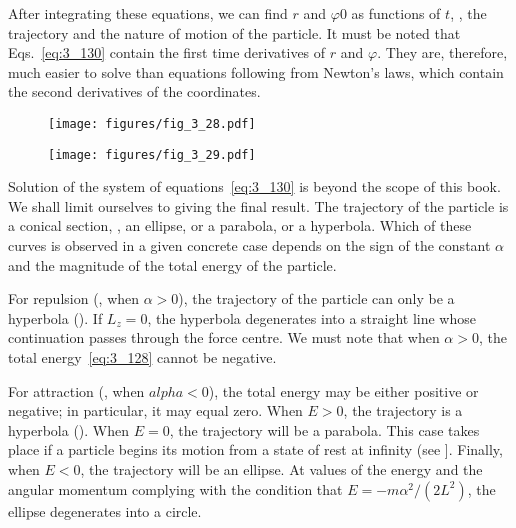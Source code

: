 \noindent
After integrating these equations, we can find $r$ and $\varphi0$ as functions of $t$, \ie, the trajectory and the nature of motion of the particle. It must be noted that Eqs.~\eqref{eq:3_130} contain the first time derivatives of $r$ and $\varphi$. They are, therefore, much easier to solve than equations following from Newton's laws, which contain the second derivatives of the coordinates.

\begin{figure}[t]
	\begin{minipage}[t]{0.5\linewidth}
		\begin{center}
			\texttt{[image: figures/fig\_3\_28.pdf]}
			\caption[]{}
			\label{fig:3_28}
		\end{center}
	\end{minipage}
	\hspace{-0.2cm}
	\begin{minipage}[t]{0.5\linewidth}
		\begin{center}
			\texttt{[image: figures/fig\_3\_29.pdf]}
			\caption[]{}
			\label{fig:3_29}
		\end{center}
	\end{minipage}
	\vspace{-0.3cm}
\end{figure}

Solution of the system of equations~\eqref{eq:3_130} is beyond the scope of this book. We shall limit ourselves to giving the final result. The trajectory of the particle is a conical section, \ie, an ellipse, or a parabola, or a hyperbola. Which of these curves is observed in a given concrete case depends on the sign of the constant $\alpha$ and the magnitude of the total energy of the particle.

For repulsion (\ie, when $\alpha>0$), the trajectory of the particle can only be a hyperbola (). If $L_z=0$, the hyperbola degenerates into a straight line whose continuation passes through the force centre. We must note that when $\alpha>0$, the total energy~\eqref{eq:3_128} cannot be negative.

For attraction (\ie, when $alpha<0$), the total energy may be either positive or negative; in particular, it may equal zero. When $E>0$, the trajectory is a hyperbola (). When $E=0$, the trajectory will be a parabola. This case takes place if a particle begins its motion from a state of rest at infinity (see ]. Finally, when $E<0$, the trajectory will be an ellipse. At values of the energy and the angular momentum complying with the condition that $E=- m\alpha^2/(2L^2)$, the ellipse degenerates into a circle.

